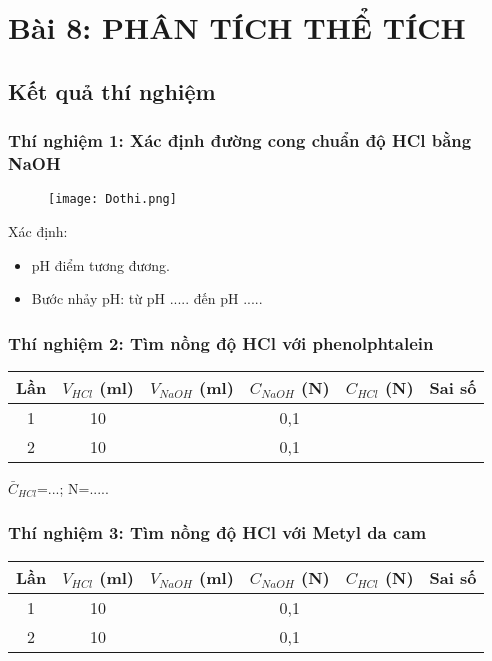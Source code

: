 \chapter{Bài 8: PHÂN TÍCH THỂ TÍCH}

\section{Kết quả thí nghiệm}

\subsection{Thí nghiệm 1: Xác định đường cong chuẩn độ HCl bằng NaOH}
\begin{center}
    \begin{figure}[htp]
        \begin{center}
            \texttt{[image: Dothi.png]}
        \end{center}
    \end{figure}
\end{center}
Xác định:
\begin{itemize}
    \item pH điểm tương đương.
    \item Bước nhảy pH: từ pH ..... đến pH .....
\end{itemize}

\newpage

\subsection{Thí nghiệm 2: Tìm nồng độ HCl với phenolphtalein}
\begin{center}
\begin{tabular}{|c|c|c|c|c|c|}
    \hline \textbf{Lần} & $V_{HCl}$ (ml) & $V_{NaOH}$ (ml) & $C_{NaOH}$ (N) & $C_{HCl}$ (N) & Sai số\\
    \hline       1      &   10           &                 &      0,1       &               &       \\
    \hline       2      &   10           &                 &      0,1        &               &       \\
    \hline
\end{tabular}
\end{center}
$\bar C_{HCl}$=...; N=.....

\subsection{Thí nghiệm 3: Tìm nồng độ HCl với Metyl da cam}
\begin{center}
    \begin{tabular}{|c|c|c|c|c|c|}
        \hline \textbf{Lần} & $V_{HCl}$ (ml) & $V_{NaOH}$ (ml) & $C_{NaOH}$ (N) & $C_{HCl}$ (N) & Sai số\\
        \hline       1      &   10           &                 &      0,1       &               &       \\
        \hline       2      &   10           &                 &      0,1        &               &       \\
        \hline
    \end{tabular}
\end{center}

